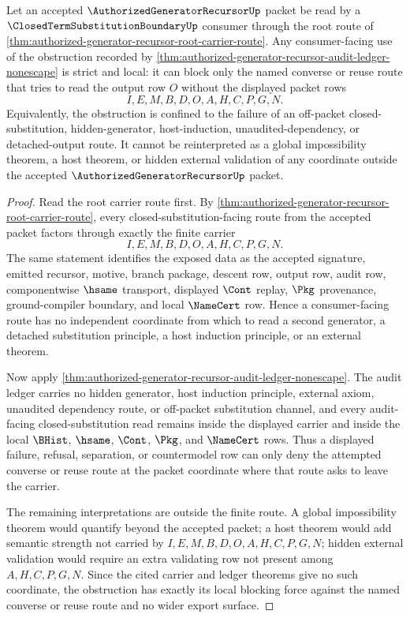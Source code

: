 \begin{corollary}
\label{cor:authorized-generator-recursor-root-route-strict-obstruction}
Let an accepted $\AuthorizedGeneratorRecursorUp$ packet be read by a $\ClosedTermSubstitutionBoundaryUp$ consumer through the root route of \autoref{thm:authorized-generator-recursor-root-carrier-route}. Any consumer-facing use of the obstruction recorded by \autoref{thm:authorized-generator-recursor-audit-ledger-nonescape} is strict and local: it can block only the named converse or reuse route that tries to read the output row $O$ without the displayed packet rows
$$
I,E,M,B,D,O,A,H,C,P,G,N.
$$
Equivalently, the obstruction is confined to the failure of an off-packet closed-substitution, hidden-generator, host-induction, unaudited-dependency, or detached-output route. It cannot be reinterpreted as a global impossibility theorem, a host theorem, or hidden external validation of any coordinate outside the accepted $\AuthorizedGeneratorRecursorUp$ packet.
\end{corollary}
\begin{proof}
Read the root carrier route first. By \autoref{thm:authorized-generator-recursor-root-carrier-route}, every closed-substitution-facing route from the accepted packet factors through exactly the finite carrier
$$
I,E,M,B,D,O,A,H,C,P,G,N.
$$
The same statement identifies the exposed data as the accepted signature, emitted recursor, motive, branch package, descent row, output row, audit row, componentwise $\hsame$ transport, displayed $\Cont$ replay, $\Pkg$ provenance, ground-compiler boundary, and local $\NameCert$ row. Hence a consumer-facing route has no independent coordinate from which to read a second generator, a detached substitution principle, a host induction principle, or an external theorem.

Now apply \autoref{thm:authorized-generator-recursor-audit-ledger-nonescape}. The audit ledger carries no hidden generator, host induction principle, external axiom, unaudited dependency route, or off-packet substitution channel, and every audit-facing closed-substitution read remains inside the displayed carrier and inside the local $\BHist$, $\hsame$, $\Cont$, $\Pkg$, and $\NameCert$ rows. Thus a displayed failure, refusal, separation, or countermodel row can only deny the attempted converse or reuse route at the packet coordinate where that route asks to leave the carrier.

The remaining interpretations are outside the finite route. A global impossibility theorem would quantify beyond the accepted packet; a host theorem would add semantic strength not carried by $I,E,M,B,D,O,A,H,C,P,G,N$; hidden external validation would require an extra validating row not present among $A,H,C,P,G,N$. Since the cited carrier and ledger theorems give no such coordinate, the obstruction has exactly its local blocking force against the named converse or reuse route and no wider export surface.
\end{proof}
